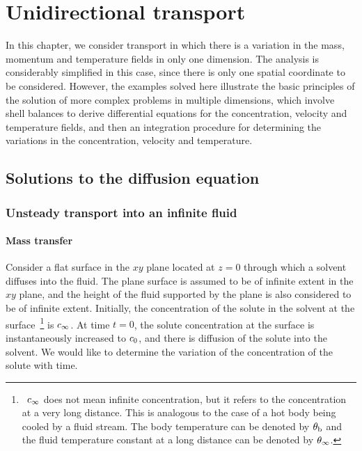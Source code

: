 \section{Unidirectional transport}
In this chapter, we consider transport in which there is a variation in the mass, momentum and temperature fields in only one dimension. The analysis is considerably simplified in this case, since there is only one spatial coordinate to be considered. However, the examples solved here illustrate the basic principles of the solution of more complex problems in multiple dimensions, which involve shell balances to derive differential equations for the concentration, velocity and temperature fields, and then an integration procedure for determining the variations in the concentration, velocity and temperature.


\subsection{Solutions to the diffusion equation}

\subsubsection{Unsteady transport into an infinite fluid}

\paragraph{Mass transfer} 
Consider a flat surface in the $xy$ plane located at $z = 0$ through which a solvent diffuses into the fluid. The plane surface is assumed to be of infinite extent in the $xy$ plane, and the height of the fluid supported by the plane is also considered to be of infinite extent. Initially, the concentration of the solute in the solvent at the surface~\footnote{~$c_\infty$ does not mean infinite concentration, but it refers to the concentration at a very long distance. This is analogous to the case of a hot body being cooled by a fluid stream. The body temperature can be denoted by $\theta_\text{b}$ and the fluid temperature constant at a long distance can be denoted by $\theta_\infty$.} is $c_\infty$. At time $t = 0$, the solute concentration at the surface is instantaneously increased to $c_0$, and there is diffusion of the solute into the solvent. We would like to determine the variation of the concentration of the solute with time.


